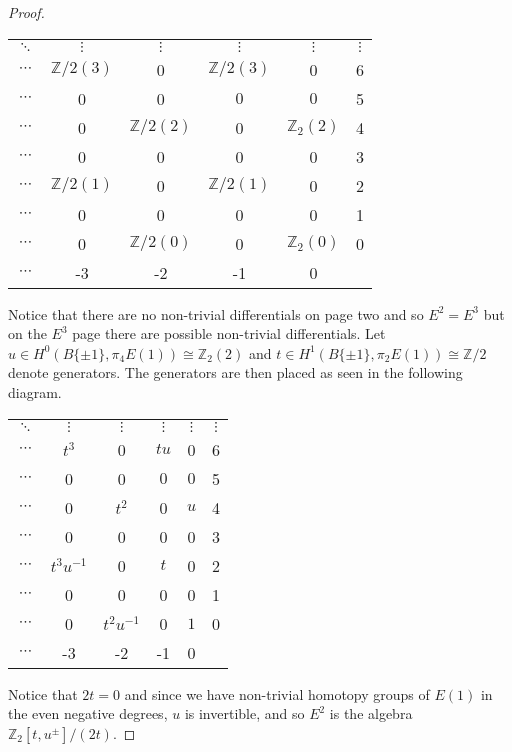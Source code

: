 \documentclass[a4paper]{article} %
\theoremstyle{definition}
\newcommand{\Z}{\mathbb{Z}}
\begin{document}
\begin{proof}
\begin{table}[H]
  \centering
  \setlength{\tabcolsep}{12pt}
  \setlength{\extrarowheight}{2pt}
\begin{tabular}{ccccc|c}
  $\ddots$      & $\vdots$ &   $\vdots$ &  $\vdots$  & $\vdots$  & $\vdots$ \\
  $\cdots$      & $\Z/2(3)$ &   0 &  $\Z/2(3)$  & 0  & 6 \\
  $\cdots$      & 0 &   0 &  $0$  & $0$  & 5 \\
    $\cdots$     & 0  &   $\Z/2(2)$ &  0  & $\Z_2(2)$  & 4 \\
    $\cdots$     &  0 &   0 &  0  &  0 & 3 \\
    $\cdots$     & $\Z/2(1)$  &  0  &  $\Z/2(1)$  &  0 & 2 \\
    $\cdots$     & 0 &  0  &  0  & 0  & 1 \\
    $\cdots$     & 0 &  $\Z/2(0)$  & 0 &  $\Z_2(0)$  & 0 \\ \hline
$\cdots$  & -3 & -2 & -1 & 0 &
\end{tabular}
\end{table}
\noindent Notice that there are no non-trivial differentials on page two and so $E^2 = E^3$ but on the $E^3$ page there are possible non-trivial differentials. Let $u \in H^0(B\{\pm 1\}, \pi_4E(1)) \cong \Z_2(2)$ and $t \in H^1(B\{\pm 1\}, \pi_2E(1)) \cong \Z/2$ denote generators. The generators are then placed as seen in the following diagram.
\begin{table}[H]
  \centering
  \setlength{\tabcolsep}{8pt}
  \setlength{\extrarowheight}{2pt}
\begin{tabular}{ccccc|c}
  $\ddots$      & $\vdots$ &   $\vdots$ &  $\vdots$  & $\vdots$  & $\vdots$ \\
  $\cdots$      & $t^3$ &   0 &  $tu$  & 0  & 6 \\
  $\cdots$      & 0 &   0 &  $0$  & $0$  & 5 \\
    $\cdots$     & 0  &   $t^2$ &  0  & $u$  & 4 \\
    $\cdots$     &  0 &   0 &  0  &  0 & 3 \\
    $\cdots$     & $t^3u^{-1}$  &  0  &  $t$  &  0 & 2 \\
    $\cdots$     & 0 &  0  &  0  & 0  & 1 \\
    $\cdots$     & 0 &  $t^2u^{-1}$  & 0 &  $1$  & 0 \\ \hline
$\cdots$  & -3 & -2 & -1 & 0 &
\end{tabular}
\end{table}
\noindent Notice that $2t=0$
and since we have non-trivial homotopy groups of $E(1)$
in the even negative degrees, $u$ is invertible, and so
$E^2$ is the algebra $\Z_2[t, u^{\pm}]/(2t)$.


\end{proof}
\end{document}
